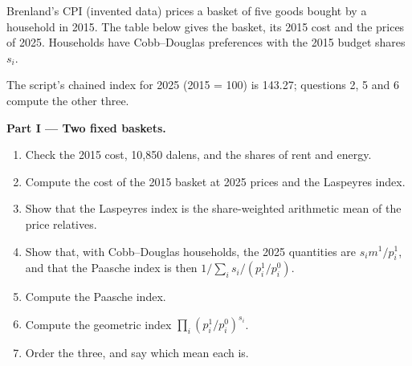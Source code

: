 \begin{problem}\label{pb:b1:consumer-welfare:cpi}
Brenland's CPI (invented data) prices a basket of five goods bought by a
household in 2015. The table below gives the basket, its 2015 cost and the
prices of 2025. Households have Cobb--Douglas preferences with the 2015
budget shares $s_i$.

\begin{center}
\end{center}

\noindent The script's chained index for 2025 (2015 = 100) is 143.27; questions
2, 5 and 6 compute the other three. %

\medskip\noindent\textbf{Part I --- Two fixed baskets.}
\begin{enumerate}
  \item Check the 2015 cost, 10,850 dalens, and the shares of rent and energy.
  \item Compute the cost of the 2015 basket at 2025 prices and the Laspeyres index.
  \item Show that the Laspeyres index is the share-weighted arithmetic mean of the price relatives.
  \item Show that, with Cobb--Douglas households, the 2025 quantities are $s_i m^1/p^1_i$, and that the Paasche index is then $1/\sum_i s_i/(p^1_i/p^0_i)$.
  \item Compute the Paasche index.
  \item Compute the geometric index $\prod_i (p^1_i/p^0_i)^{s_i}$.
  \item Order the three, and say which mean each is.
\end{enumerate}


\end{problem}
